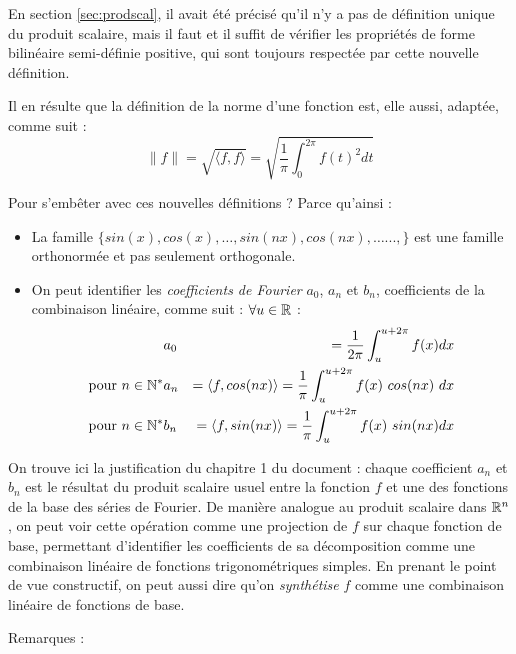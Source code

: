 En section \ref{sec:prodscal}, il avait été précisé qu'il n'y a pas de définition unique du produit scalaire, mais il faut et il suffit de vérifier les propriétés de forme bilinéaire semi-définie positive, qui sont toujours respectée par cette nouvelle définition. 

Il en résulte que la définition de la norme d'une fonction est, elle aussi, adaptée, comme suit :
\begin{equation}
\|f\|= \sqrt{\langle f, f \rangle}= \sqrt{ \frac{1}{\pi}\int_0^{2\pi} f(t)^2dt}
\end{equation} 

Pour s'embêter avec ces nouvelles définitions ? Parce qu'ainsi :
\begin{itemize}
  \item La famille $\{sin(x),cos(x),\dots,sin(nx),cos(nx),\dots...,\}$ est une famille orthonormée et pas seulement orthogonale.
  \item On peut identifier les \emph{coefficients de Fourier} $a_0$, $a_n$ et
 $b_n$, coefficients de la combinaison linéaire, comme suit :
 $\forall u\in \mathbb{R}$ :
\begin{eqnarray}
& a_0 & =\frac{1}{2\pi}\int_{u}^{u+2\pi}f(x)dx \label{a0}\\
\text{pour} ~ n\in \mathbb{N}^* & a_n & = \langle f, cos(nx) \rangle = \frac{1}{\pi}\int_{u}^{u+2\pi}f(x)~ cos(nx)~ dx  \label{an}\\
\text{pour} ~ n\in \mathbb{N}^* & b_n & = \langle f, sin(nx) \rangle= \frac{1}{\pi}\int_{u}^{u+2\pi}f(x)~ sin(nx) dx  \label{bn}
\end{eqnarray}
  \end{itemize}


On trouve ici la justification du chapitre 1 du document : chaque coefficient $a_n$ et $b_n$ est le résultat du produit
  scalaire usuel entre la fonction $f$ et une des fonctions de la base des
  séries de Fourier. De manière analogue au produit scalaire dans
  $\mathbb{R}^n$, on peut voir cette opération comme une projection de $f$
  sur chaque fonction de base, permettant d'identifier les
  coefficients de sa décomposition comme une combinaison linéaire de
  fonctions trigonométriques simples. En prenant le point de vue
  constructif, on peut aussi dire qu'on \emph{synthétise}  $f$ comme une combinaison linéaire de fonctions de base.

Remarques  :

